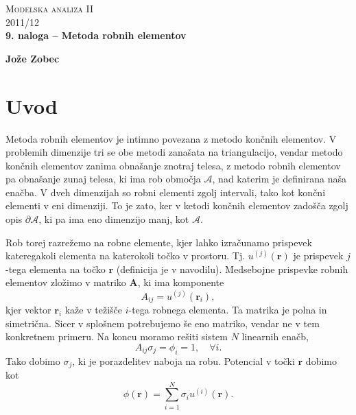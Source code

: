 \documentclass[a4 paper, 12pt]{article}
\renewcommand{\r}{
	\ensuremath{\mathbf{r}}
}
\begin{document}
\begin{center}
\textsc{Modelska analiza II}\\
\textsc{2011/12}\\[0.5cm]
\textbf{9. naloga -- Metoda robnih elementov}
\end{center}
\begin{flushright}
\textbf{Jože Zobec}\\
\end{flushright}

\section{Uvod}

Metoda robnih elementov je intimno povezana z metodo kon\v cnih elementov. V problemih dimenzije tri se
obe metodi zana\v sata na triangulacijo, vendar metodo kon\v cnih elementov zanima obna\v sanje znotraj telesa,
z metodo robnih elementov pa obna\v sanje zunaj telesa, ki ima rob obmo\v cja $\mathcal{A}$, nad katerim
je definirana na\v sa ena\v cba. V dveh dimenzijah so robni elementi zgolj intervali, tako kot kon\v cni
elementi v eni dimenziji. To je zato, ker v ketodi kon\v cnih elementov zado\v s\v ca zgolj opis
$\partial \mathcal{A}$, ki pa ima eno dimenzijo manj, kot $\mathcal{A}$.

Rob torej razre\v zemo na robne elemente, kjer lahko izra\v cunamo prispevek kateregakoli elementa na
katerokoli to\v cko v prostoru. Tj. $u^{(j)}(\r)$ je prispevek $j$-tega elementa na to\v cko $\r$ (definicija
je v navodilu). Medsebojne prispevke robnih elementov zlo\v zimo v matriko $\mathbf{A}$, ki ima komponente
\[
	A_{ij} = u^{(j)}(\r_i),
\]
kjer vektor $\r_i$ ka\v ze v te\v zi\v s\v ce $i$-tega robnega elementa.
Ta matrika je polna in simetri\v cna. Sicer v splo\v snem potrebujemo \v se eno matriko, vendar ne v
tem konkretnem primeru. Na koncu moramo re\v siti sistem $N$ linearnih ena\v cb,
\[
	A_{ij} \sigma_j = \phi_i = 1, \quad \forall i.
\] 
Tako dobimo $\sigma_j$, ki je porazdelitev naboja na robu. Potencial v to\v cki $\r$ dobimo kot
\[
	\phi(\r) = \sum_{i = 1}^N \sigma_i u^{(i)} (\r).
\] 
\end{document}
